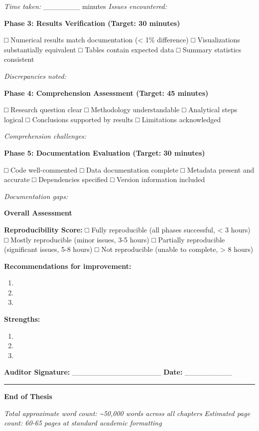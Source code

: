 \documentclass[
  oneside,
  open=any]{scrbook}
\providecommand{\tightlist}{%
  \setlength{\itemsep}{0pt}\setlength{\parskip}{0pt}}\usepackage{longtable,booktabs,array}
\begin{document}
\emph{Time taken:} \_\_\_\_\_\_\_ minutes \emph{Issues encountered:}

\textbf{Phase 3: Results Verification (Target: 30 minutes)}

□ Numerical results match documentation (\textless{} 1\% difference) □
Visualizations substantially equivalent □ Tables contain expected data □
Summary statistics consistent

\emph{Discrepancies noted:}

\textbf{Phase 4: Comprehension Assessment (Target: 45 minutes)}

□ Research question clear □ Methodology understandable □ Analytical
steps logical □ Conclusions supported by results □ Limitations
acknowledged

\emph{Comprehension challenges:}

\textbf{Phase 5: Documentation Evaluation (Target: 30 minutes)}

□ Code well-commented □ Data documentation complete □ Metadata present
and accurate □ Dependencies specified □ Version information included

\emph{Documentation gaps:}

\textbf{Overall Assessment}

\textbf{Reproducibility Score:} □ Fully reproducible (all phases
successful, \textless{} 3 hours) □ Mostly reproducible (minor issues,
3-5 hours) □ Partially reproducible (significant issues, 5-8 hours) □
Not reproducible (unable to complete, \textgreater{} 8 hours)

\textbf{Recommendations for improvement:}

\begin{enumerate}
\def\labelenumi{\arabic{enumi}.}
\tightlist
\item
\item
\item
\end{enumerate}

\textbf{Strengths:}

\begin{enumerate}
\def\labelenumi{\arabic{enumi}.}
\tightlist
\item
\item
\item
\end{enumerate}

\textbf{Auditor Signature:} \_\_\_\_\_\_\_\_\_\_\_\_\_\_\_\_\_
\textbf{Date:} \_\_\_\_\_\_\_\_\_

\begin{center}\rule{0.5\linewidth}{0.5pt}\end{center}

\textbf{End of Thesis}

\emph{Total approximate word count: \textasciitilde50,000 words across
all chapters} \emph{Estimated page count: 60-65 pages at standard
academic formatting}


\backmatter
\end{document}
